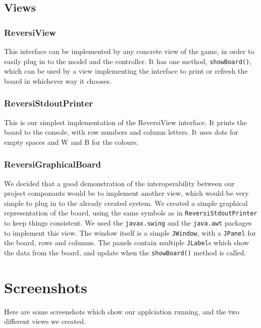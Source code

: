 \documentclass[11pt,a4paper,oneside]{article}
\begin{document}
\subsection*{Views}
\subsubsection*{ReversiView}
This interface can be implemented by any concrete view of the game, in order to easily plug in to the model and the controller. It has one method, \texttt{showBoard()}, which can be used by a view implementing the interface to print or refresh the board in whichever way it chooses.

\subsubsection*{ReversiStdoutPrinter}
This is our simplest implementation of the ReversiView interface. It prints the board to the console, with row numbers and column letters. It uses dots for empty spaces and W and B for the colours.

\subsubsection*{ReversiGraphicalBoard}
We decided that a good demonstration of the interoperability between our project componants would be to implement another view, which would be very simple to plug in to the already created system. We created a simple graphical representation of the board, using the same symbols as in \texttt{ReversiStdoutPrinter} to keep things consistent. We used the \texttt{javax.swing} and the \texttt{java.awt} packages to implement this view. The window itself is a simple \texttt{JWindow}, with a \texttt{JPanel} for the board, rows and columns. The panels contain multiple \texttt{JLabel}s which show the data from the board, and update when the \texttt{showBoard()} method is called.

\section*{Screenshots}
Here are some screenshots which show our applciation running, and the two different views we created.\\
\end{document}
